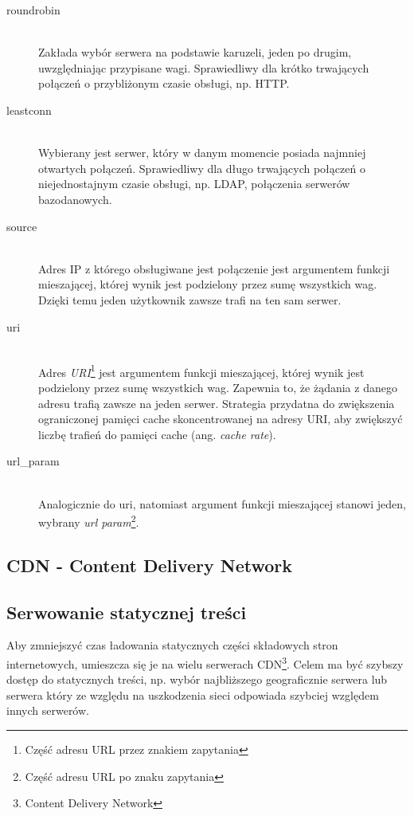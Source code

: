 \begin{description}
  \item[roundrobin] \hfill \\
  Zakłada wybór serwera na podstawie karuzeli, jeden po drugim, uwzględniając przypisane wagi. Sprawiedliwy dla krótko trwających połączeń o przybliżonym czasie obsługi, np. HTTP.
  \item[leastconn] \hfill \\
  Wybierany jest serwer, który w danym momencie posiada najmniej otwartych połączeń. Sprawiedliwy dla długo trwających połączeń o niejednostajnym czasie obsługi, np. LDAP, połączenia serwerów bazodanowych.
  \item[source] \hfill \\
  Adres IP z którego obsługiwane jest połączenie jest argumentem funkcji mieszającej, której wynik jest podzielony przez sumę wszystkich wag. Dzięki temu jeden użytkownik zawsze trafi na ten sam serwer.
  \item[uri] \hfill \\
  Adres \emph{URI}\footnote{Część adresu URL przez znakiem zapytania} jest argumentem funkcji mieszającej, której wynik jest podzielony przez sumę wszystkich wag. Zapewnia to, że żądania z danego adresu trafią zawsze na jeden serwer. Strategia przydatna do zwiększenia ograniczonej pamięci cache skoncentrowanej na adresy URI, aby zwiększyć liczbę trafień do pamięci cache (ang. \emph{cache rate}).
  \item[url_param] \hfill \\
  Analogicznie do uri, natomiast argument funkcji mieszającej stanowi jeden, wybrany \emph{url param}\footnote{Część adresu URL po znaku zapytania}.
\end{description}

\subsection{CDN - Content Delivery Network}
\label{subsub:cdn}

\subsection{Serwowanie statycznej treści}

Aby zmniejszyć czas ładowania statycznych części składowych stron internetowych, umieszcza się je na wielu serwerach CDN\footnote{Content Delivery Network}. Celem ma być szybszy dostęp do statycznych treści, np. wybór najbliższego geograficznie serwera lub serwera który ze względu na uszkodzenia sieci odpowiada szybciej względem innych serwerów.

